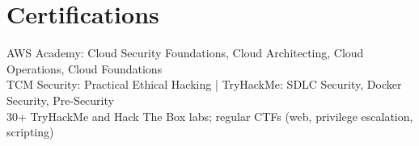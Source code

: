\documentclass[10pt]{article}
\begin{document}
\section{Certifications}
AWS Academy: Cloud Security Foundations, Cloud Architecting, Cloud Operations, Cloud Foundations\\
TCM Security: Practical Ethical Hacking | TryHackMe: SDLC Security, Docker Security, Pre-Security\\
30+ TryHackMe and Hack The Box labs; regular CTFs (web, privilege escalation, scripting)
\end{document}
